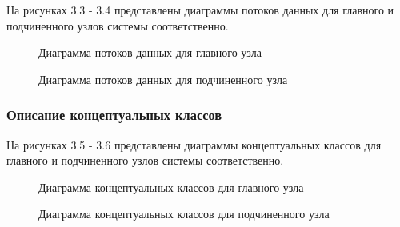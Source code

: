 На рисунках 3.3 - 3.4 представлены диаграммы потоков данных для главного и подчиненного узлов системы соответственно.

\begin{figure}
\caption{Диаграмма потоков данных для главного узла}
\label{robot/diagram_dataflow_master:image}
\end{figure}

\begin{figure}
\caption{Диаграмма потоков данных для подчиненного узла}
\label{robot/diagram_dataflow_slave:image}
\end{figure}

\subsubsection{Описание концептуальных классов}

На рисунках 3.5 - 3.6 представлены диаграммы концептуальных классов для главного и подчиненного узлов системы соответственно.

\begin{figure}
\caption{Диаграмма концептуальных классов для главного узла}
\label{robot/diagram_master_classes:image}
\end{figure}

\begin{figure}
\caption{Диаграмма концептуальных классов для подчиненного узла}
\label{robot/diagram_slave_classe:image}
\end{figure}
